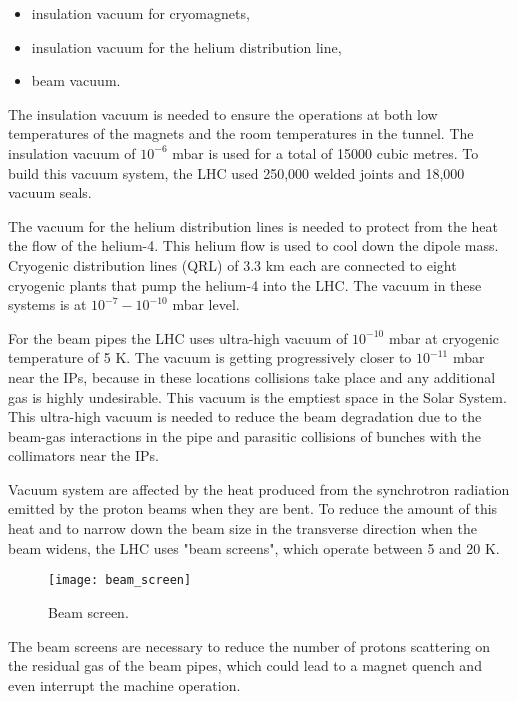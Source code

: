 \begin{normalsize}
\begin{itemize}
\item insulation vacuum for cryomagnets,
\item insulation vacuum for the helium distribution line,
\item beam vacuum.
\end{itemize}


The insulation vacuum is needed to ensure the operations at both low temperatures of the magnets and the room temperatures in the tunnel. The insulation vacuum of $10^{-6}$ mbar is used for a total of 15000 cubic metres. To build this vacuum system, the LHC used 250,000 welded joints and 18,000 vacuum seals. 


The vacuum for the helium distribution lines is needed to protect from the heat the flow of the helium-4. This helium flow is used to cool down the dipole mass. Cryogenic distribution lines (QRL) of 3.3 km each are connected to eight cryogenic plants that pump the helium-4 into the LHC. The vacuum in these systems is at $10^{-7}-10^{-10}$ mbar level. 



For the beam pipes the LHC uses ultra-high vacuum of $10^{-10}$ mbar at cryogenic temperature of 5 K. The vacuum is getting progressively closer to $10^{-11}$ mbar near the IPs, because in these locations collisions take place and any additional gas is highly undesirable. This vacuum is the emptiest space in the Solar System. This ultra-high vacuum is needed to reduce the beam degradation due to the beam-gas interactions in the pipe and parasitic collisions of bunches with the collimators near the IPs. 

Vacuum system are affected by the heat produced from the synchrotron radiation emitted by the proton beams when they are bent. To reduce the amount of this heat and to narrow down the beam size in the transverse direction when the beam widens, the LHC uses "beam screens", which operate between 5 and 20 K. 


\begin{figure}[H]
  \centering
  \texttt{[image: beam\_screen]}
  \caption{Beam screen.}\label{beam_screen}
\end{figure}



The beam screens are necessary to reduce the number of protons scattering on the residual gas of the beam pipes, which could lead to a magnet quench and even interrupt the machine operation. 


\end{normalsize}
